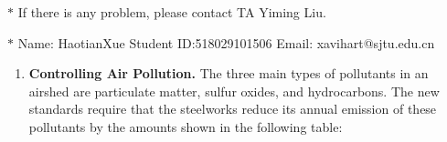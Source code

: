 \documentclass[12pt,a4paper]{article}
\theoremstyle{definition}
\begin{document}
\renewcommand\tablename{Table}
\noindent
{}
\noindent{}
\begin{center}
\footnotesize{\color{red}$*$ If there is any problem, please contact TA Yiming Liu. }

\footnotesize{\color{blue}$*$ Name: HaotianXue  \quad Student ID:518029101506 \quad Email: xavihart@sjtu.edu.cn}
\end{center}
\begin{enumerate}

   \item 
   \textbf{Controlling Air Pollution. }The three main types of pollutants in an airshed are particulate matter, sulfur oxides, and hydrocarbons. The new standards require that the steelworks reduce its annual emission of these pollutants by the amounts shown in the following table: 
	\begin{table}[h]
		\footnotesize
		\centering
	    \label{standards}
	    \renewcommand\arraystretch{1.1}
		\begin{tabular}{lc}
			

\end{tabular}
\end{table}
\end{enumerate}
\end{document}
